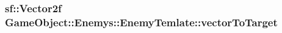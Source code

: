 \subsubsection[{\texorpdfstring{vector\+To\+Target}{vectorToTarget}}]{\setlength{\rightskip}{0pt plus 5cm}sf\+::\+Vector2f Game\+Object\+::\+Enemys\+::\+Enemy\+Temlate\+::vector\+To\+Target}\hypertarget{classGameObject_1_1Enemys_1_1EnemyTemlate_af50eeadd76fdc2654945568205f7aef4}{}\label{classGameObject_1_1Enemys_1_1EnemyTemlate_af50eeadd76fdc2654945568205f7aef4}
